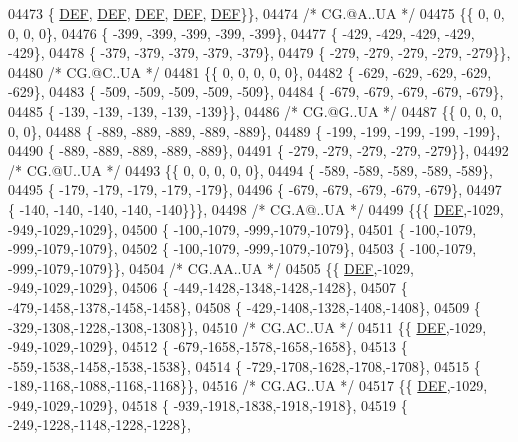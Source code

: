 \begin{DoxyCode}
04473 \{  \mbox{\hyperlink{1_88_84__epars_8h_a397419fc12b37ed479c8abb9d444d843}{DEF}},  \mbox{\hyperlink{1_88_84__epars_8h_a397419fc12b37ed479c8abb9d444d843}{DEF}},  \mbox{\hyperlink{1_88_84__epars_8h_a397419fc12b37ed479c8abb9d444d843}{DEF}},  \mbox{\hyperlink{1_88_84__epars_8h_a397419fc12b37ed479c8abb9d444d843}{DEF}},  \mbox{\hyperlink{1_88_84__epars_8h_a397419fc12b37ed479c8abb9d444d843}{DEF}}\}\},
04474 \textcolor{comment}{/* CG.@A..UA */}
04475 \{\{    0,    0,    0,    0,    0\},
04476 \{ -399, -399, -399, -399, -399\},
04477 \{ -429, -429, -429, -429, -429\},
04478 \{ -379, -379, -379, -379, -379\},
04479 \{ -279, -279, -279, -279, -279\}\},
04480 \textcolor{comment}{/* CG.@C..UA */}
04481 \{\{    0,    0,    0,    0,    0\},
04482 \{ -629, -629, -629, -629, -629\},
04483 \{ -509, -509, -509, -509, -509\},
04484 \{ -679, -679, -679, -679, -679\},
04485 \{ -139, -139, -139, -139, -139\}\},
04486 \textcolor{comment}{/* CG.@G..UA */}
04487 \{\{    0,    0,    0,    0,    0\},
04488 \{ -889, -889, -889, -889, -889\},
04489 \{ -199, -199, -199, -199, -199\},
04490 \{ -889, -889, -889, -889, -889\},
04491 \{ -279, -279, -279, -279, -279\}\},
04492 \textcolor{comment}{/* CG.@U..UA */}
04493 \{\{    0,    0,    0,    0,    0\},
04494 \{ -589, -589, -589, -589, -589\},
04495 \{ -179, -179, -179, -179, -179\},
04496 \{ -679, -679, -679, -679, -679\},
04497 \{ -140, -140, -140, -140, -140\}\}\},
04498 \textcolor{comment}{/* CG.A@..UA */}
04499 \{\{\{  \mbox{\hyperlink{1_88_84__epars_8h_a397419fc12b37ed479c8abb9d444d843}{DEF}},-1029, -949,-1029,-1029\},
04500 \{ -100,-1079, -999,-1079,-1079\},
04501 \{ -100,-1079, -999,-1079,-1079\},
04502 \{ -100,-1079, -999,-1079,-1079\},
04503 \{ -100,-1079, -999,-1079,-1079\}\},
04504 \textcolor{comment}{/* CG.AA..UA */}
04505 \{\{  \mbox{\hyperlink{1_88_84__epars_8h_a397419fc12b37ed479c8abb9d444d843}{DEF}},-1029, -949,-1029,-1029\},
04506 \{ -449,-1428,-1348,-1428,-1428\},
04507 \{ -479,-1458,-1378,-1458,-1458\},
04508 \{ -429,-1408,-1328,-1408,-1408\},
04509 \{ -329,-1308,-1228,-1308,-1308\}\},
04510 \textcolor{comment}{/* CG.AC..UA */}
04511 \{\{  \mbox{\hyperlink{1_88_84__epars_8h_a397419fc12b37ed479c8abb9d444d843}{DEF}},-1029, -949,-1029,-1029\},
04512 \{ -679,-1658,-1578,-1658,-1658\},
04513 \{ -559,-1538,-1458,-1538,-1538\},
04514 \{ -729,-1708,-1628,-1708,-1708\},
04515 \{ -189,-1168,-1088,-1168,-1168\}\},
04516 \textcolor{comment}{/* CG.AG..UA */}
04517 \{\{  \mbox{\hyperlink{1_88_84__epars_8h_a397419fc12b37ed479c8abb9d444d843}{DEF}},-1029, -949,-1029,-1029\},
04518 \{ -939,-1918,-1838,-1918,-1918\},
04519 \{ -249,-1228,-1148,-1228,-1228\},

\end{DoxyCode}
